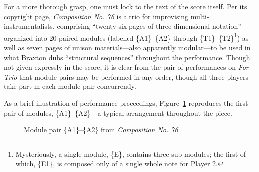         For a more thorough grasp, one must look to the text of the score itself. Per its copyright page, \textit{Composition No. 76} is a trio for improvising multi-instrumentalists, comprising ``twenty-six pages of three-dimensional notation'' organized into 20 paired modules (labelled \{A1\}--\{A2\} through \{T1\}--\{T2\}\footnote{Mysteriously, a single module, \{E\}, contains three sub-modules; the first of which, \{E1\}, is composed only of a single whole note for Player 2.}) as well as seven pages of unison materials---also apparently modular---to be used in what Braxton dubs ``structural sequences'' throughout the performance.\autocite[149]{Braxton_1988} Though not given expressly in the score, it is clear from the pair of performances on \textit{For Trio} that module pairs may be performed in any order, though all three players take part in each module pair concurrently.
        
        As a brief illustration of performance proceedings, Figure~\ref{fig:a1a2} reproduces the first pair of modules, \{A1\}--\{A2\}---a typical arrangement throughout the piece.
    
                \begin{figure} 
                    \centering
                    \captionsetup{width=.5\textwidth}
                    \caption[Module pair \{A1\}--\{A2\} from \textit{Composition No. 76}.]{Module pair \{A1\}--\{A2\} from \textit{Composition No. 76}.\footnotemark}
                    \label{fig:a1a2}
                \end{figure}
    
